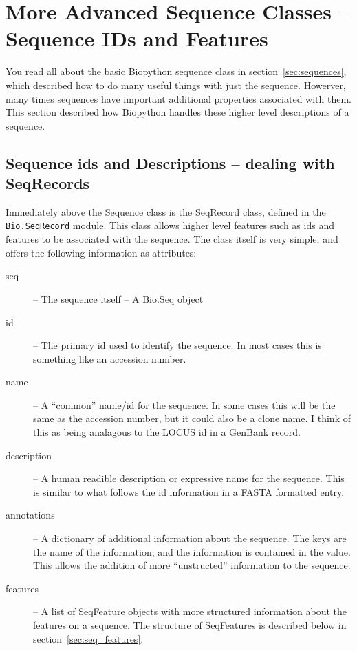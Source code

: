 \documentclass{report}
\begin{document}
\section{More Advanced Sequence Classes -- Sequence IDs and Features}
\label{sec:advanced-seq}

You read all about the basic Biopython sequence class in section~\ref{sec:sequences}, which described how to do many useful things with just the sequence. Howerver, many times sequences have important additional properties associated with them. This section described how Biopython handles these higher level descriptions of a sequence.

\subsection{Sequence ids and Descriptions -- dealing with SeqRecords}

Immediately above the Sequence class is the SeqRecord class, defined in the \verb|Bio.SeqRecord| module. This class allows higher level features such as ids and features to be associated with the sequence. The class itself is very simple, and offers the following information as attributes:

\begin{description}
  \item[seq] -- The sequence itself -- A Bio.Seq object

  \item[id] -- The primary id used to identify the sequence. In most cases this is something like an accession number.

  \item[name] -- A ``common'' name/id for the sequence. In some cases this will be the same as the accession number, but it could also be a clone name. I think of this as being analagous to the LOCUS id in a GenBank record.

  \item[description] -- A human readible description or expressive name for the sequence. This is similar to what follows the id information in a FASTA formatted entry.

  \item[annotations] -- A dictionary of additional information about the sequence. The keys are the name of the information, and the information is contained in the value. This allows the addition of more ``unstructed'' information to the sequence.

  \item[features] -- A list of SeqFeature objects with more structured information about the features on a sequence. The structure of SeqFeatures is described below in section~\ref{sec:seq_features}.
\end{description}
\end{document}
